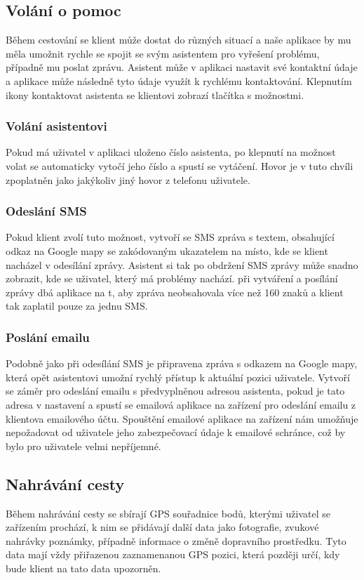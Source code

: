 \documentclass{article}
\begin{document}
\subsection{Volání o pomoc}
Během cestování se klient může dostat do různých situací a naše aplikace by mu měla umožnit rychle se
spojit se svým asistentem pro vyřešení problému, případně mu poslat zprávu. Asistent může v aplikaci nastavit své kontaktní
údaje a aplikace může následně tyto údaje využít k rychlému kontaktování. Klepnutím ikony kontaktovat
asistenta se klientovi zobrazí tlačítka s možnostmi.

\subsubsection{Volání asistentovi}
Pokud má uživatel v aplikaci uloženo číslo asistenta, po klepnutí na možnost volat se automaticky
vytočí jeho číslo a spustí se vytáčení. Hovor je v tuto chvíli zpoplatněn jako jakýkoliv jiný hovor
z telefonu uživatele.

\subsubsection{Odeslání SMS}
Pokud klient zvolí tuto možnost, vytvoří se SMS zpráva s textem, obsahující odkaz na Google mapy
se zakódovaným ukazatelem na místo, kde se klient nacházel v odesílání zprávy. Asistent si tak po obdržení
SMS zprávy může snadno zobrazit, kde se uživatel, který má problémy nachází. při vytváření a posílání zprávy
dbá aplikace na t, aby zpráva neobsahovala více než 160 znaků a klient tak zaplatil pouze za jednu SMS.

\subsubsection{Poslání emailu}
Podobně jako při odesílání SMS je připravena zpráva s odkazem na Google mapy, která opět asistentovi
umožní rychlý přístup k aktuální pozici uživatele. Vytvoří se záměr pro odeslání emailu s předvyplněnou
adresou asistenta, pokud je tato adresa v nastavení a spustí se emailová aplikace na zařízení pro odeslání
emailu z klientova emailového účtu. Spouštění emailové aplikace na zařízení nám umožňuje nepožadovat
od uživatele jeho zabezpečovací údaje k emailové schránce, což by bylo pro uživatele velmi nepříjemné.



\subsection{Nahrávání cesty}
Během nahrávání cesty se sbírají GPS souřadnice bodů, kterými uživatel se zařízením prochází,
k nim se přidávají další data jako fotografie, zvukové nahrávky poznámky,
případně informace o změně dopravního prostředku. Tyto data mají vždy přiřazenou zaznamenanou
GPS pozici, která později určí, kdy bude klient na tato data upozorněn.
\end{document}
